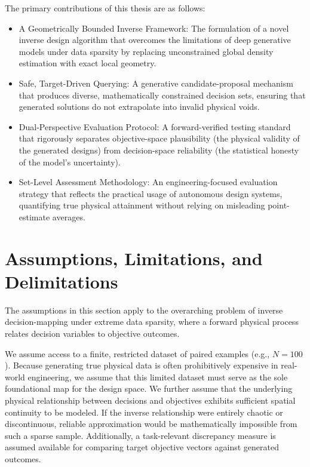 The primary contributions of this thesis are as follows:
\begin{itemize}
    \item A Geometrically Bounded Inverse Framework: The formulation of a novel inverse design algorithm that overcomes the limitations of deep generative models under data sparsity by replacing unconstrained global density estimation with exact local geometry.
    \item Safe, Target-Driven Querying: A generative candidate-proposal mechanism that produces diverse, mathematically constrained decision sets, ensuring that generated solutions do not extrapolate into invalid physical voids.
    \item Dual-Perspective Evaluation Protocol: A forward-verified testing standard that rigorously separates objective-space plausibility (the physical validity of the generated designs) from decision-space reliability (the statistical honesty of the model's uncertainty).
    \item Set-Level Assessment Methodology: An engineering-focused evaluation strategy that reflects the practical usage of autonomous design systems, quantifying true physical attainment without relying on misleading point-estimate averages.
\end{itemize}




\section{Assumptions, Limitations, and Delimitations}
\label{sec:assumptions-limitations-and-delimitations}

The assumptions in this section apply to the overarching problem of inverse decision-mapping under extreme data sparsity, where a forward physical process relates decision variables to objective outcomes.

We assume access to a finite, restricted dataset of paired examples (e.g., $N=100$). Because generating true physical data is often prohibitively expensive in real-world engineering, we assume that this limited dataset must serve as the sole foundational map for the design space. We further assume that the underlying physical relationship between decisions and objectives exhibits sufficient spatial continuity to be modeled. If the inverse relationship were entirely chaotic or discontinuous, reliable approximation would be mathematically impossible from such a sparse sample. Additionally, a task-relevant discrepancy measure is assumed available for comparing target objective vectors against generated outcomes.

